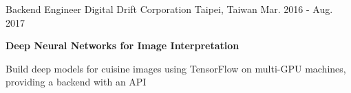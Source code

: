 \documentclass[12pt, a4paper]{awesome-cv}
\begin{document}
\begin{cventries}
    \cventry
    {Backend Engineer}
    {Digital Drift Corporation}
    {Taipei, Taiwan}
    {Mar. 2016 - Aug. 2017}
    {
        \begin{cvitems}
        \item{\bfseries Deep Neural Networks for Image Interpretation}
            \begin{cvitems}
            \item{Build deep models for cuisine images using TensorFlow on multi-GPU machines, providing a backend with an API}
            \end{cvitems}
        \end{cvitems}
    }

    \iffalse
    \cventry
    {Private Tutor}
    {Olympiad Tutoring Community}
    {Taipei, Taiwan}
    {Sep. 2011 - Jun. 2015}
    {
        \begin{cvitems}
        \item{Offer tutoring for high school physics, competition physics, GRE subject test (physics), and SAT II subject test (physics)}
        \item{Two students became national representatives for Taiwan in International Physics Olympiad (IPhO)}
        \end{cvitems}
    }
    \fi
\end{cventries}
\end{document}
